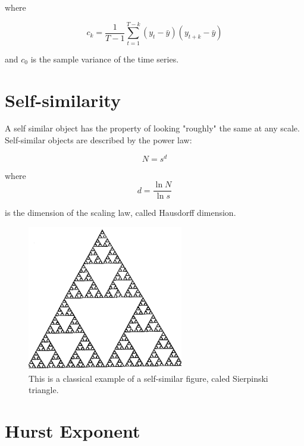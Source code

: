 where 

\begin{equation}
c_{k} = \frac{1}{T - 1}\sum_{t = 1}^{T - k} (y_{t} - \bar{y})(y_{t+k} - \bar{y})
\end{equation}

and $c_{0}$ is the sample variance of the time series. 
	

\section{Self-similarity}

A self similar object has the property of looking "roughly" the same at any scale. Self-similar objects are described by the power law:

\begin{equation}
	N = s^{d}
\end{equation}

where 
\begin{equation}
	d = \frac{\ln{N}}{\ln{s}}
\end{equation}

is the dimension of the scaling law, called  Hausdorff dimension\cite{web-self-similar}. 


\begin{figure}[ht!]
	\centering
	\includegraphics[height=2.5in]{figures/apA/tritrans}
	\caption{This is a classical example of a self-similar figure, caled Sierpinski triangle.}
	\label{fig:self-similar-figure-example}
\end{figure}



\section{Hurst Exponent}


